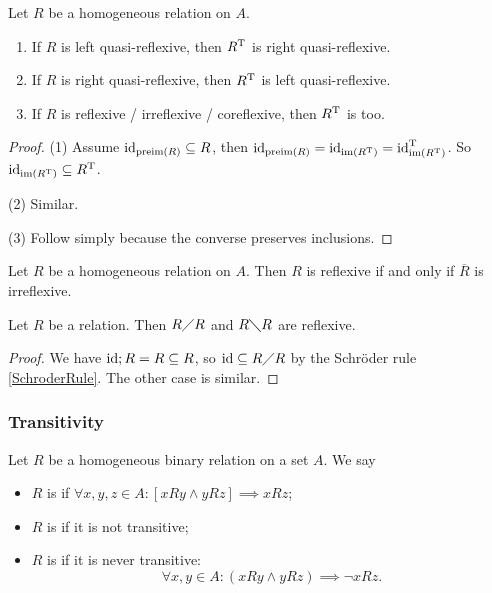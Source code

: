 \begin{lemma}
Let $R$ be a homogeneous relation on $A$.
\begin{enumerate}
\item If $R$ is left quasi-reflexive, then $R^{\mathrm{T}}$ is right quasi-reflexive.
\item If $R$ is right quasi-reflexive, then $R^{\mathrm{T}}$ is left quasi-reflexive.
\item If $R$ is reflexive / irreflexive / coreflexive, then $R^{\mathrm{T}}$ is too.
\end{enumerate}
\end{lemma}
\begin{proof}
(1) Assume $\operatorname{id}_{\operatorname{preim}(R)} \subseteq R$, then $\operatorname{id}_{\operatorname{preim}(R)} = \operatorname{id}_{\operatorname{im}(R^{\mathrm{T}})} = \operatorname{id}_{\operatorname{im}(R^{\mathrm{T}})}^{\mathrm{T}}$. So $\operatorname{id}_{\operatorname{im}(R^{\mathrm{T}})} \subseteq R^{\mathrm{T}}$.

(2) Similar.

(3) Follow simply because the converse preserves inclusions.
\end{proof}

\begin{lemma} \label{reflexiveIrreflexive}
Let $R$ be a homogeneous relation on $A$. Then $R$ is reflexive \textup{if and only if} $\overline{R}$ is irreflexive.
\end{lemma}

\begin{lemma}
Let $R$ be a relation. Then $R\diagup R$ and $R\diagdown R$ are reflexive.
\end{lemma}
\begin{proof}
We have $\operatorname{id}; R = R \subseteq R$, so $\operatorname{id} \subseteq R\diagup R$ by the Schröder rule \ref{SchroderRule}. The other case is similar.
\end{proof}

\subsubsection{Transitivity}
\begin{definition}
Let $R$ be a homogeneous binary relation on a set $A$. We say
\begin{itemize}
\item $R$ is  if $\forall x,y,z\in A: [xRy \land yRz] \implies xRz$;
\item $R$ is  if it is not transitive;
\item $R$ is  if it is never transitive:
\[ \forall x,y\in A: (xRy\land yRz) \implies \neg xRz.\]
\end{itemize}
\end{definition}

